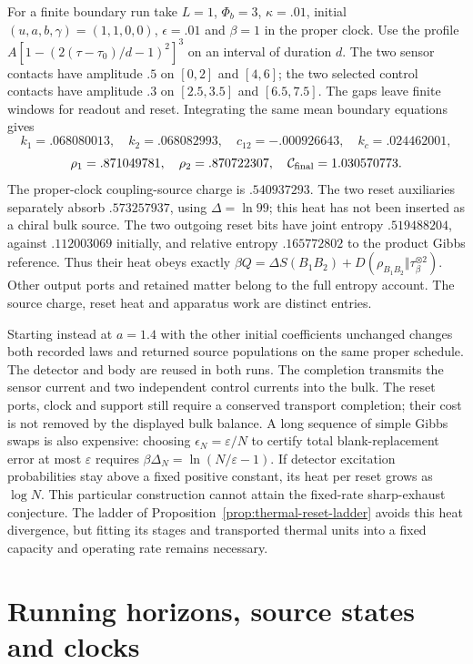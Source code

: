 For a finite boundary run take $L=1$, $\Phi_b=3$, $\kappa=.01$,
initial $(u,a,b,\gamma)=(1,1,0,0)$, $\epsilon=.01$ and $\beta=1$ in
the proper clock. Use the profile
$A[1-(2(\tau-\tau_0)/d-1)^2]^3$ on an interval of duration $d$.
The two sensor contacts have amplitude $.5$ on $[0,2]$ and $[4,6]$;
the two selected control contacts have amplitude $.3$ on $[2.5,3.5]$
and $[6.5,7.5]$. The gaps leave finite windows for readout and reset.
Integrating the same mean boundary equations gives
\[
 k_1=.068080013,\quad k_2=.068082993,\quad
 c_{12}=-.000926643,\quad k_c=.024462001,
\]
\[
 \rho_1=.871049781,\quad \rho_2=.870722307,\quad
 \mathcal C_{\rm final}=1.030570773 .
\]
The proper-clock coupling-source charge is $.540937293$.
The two reset auxiliaries separately absorb $.573257937$, using
$\Delta=\ln99$; this heat has not been inserted as a chiral bulk source.
The two outgoing reset bits have joint entropy $.519488204$, against
$.112003069$ initially, and relative entropy $.165772802$ to the product
Gibbs reference. Thus their heat obeys exactly
$\beta Q=\Delta S(B_1B_2)+D(\rho_{B_1B_2}\Vert\tau_\beta^{\otimes2})$.
Other output ports and retained matter belong to the full entropy account.
The source charge, reset heat and apparatus work are distinct entries.

Starting instead at $a=1.4$ with the other initial coefficients unchanged
changes both recorded laws and returned source populations on the same
proper schedule. The detector and body are reused in both runs.
The completion transmits the sensor current and two independent control
currents into the bulk. The reset ports, clock and support still require a
conserved transport completion; their cost is not removed by the displayed
bulk balance. A long sequence of simple Gibbs swaps is also expensive:
choosing $\epsilon_N=\varepsilon/N$ to certify total blank-replacement error
at most $\varepsilon$ requires
$\beta\Delta_N=\ln(N/\varepsilon-1)$.
If detector excitation probabilities stay above a fixed positive constant,
its heat per reset grows as $\log N$. This particular construction cannot
attain the fixed-rate sharp-exhaust conjecture.
The ladder of Proposition~\ref{prop:thermal-reset-ladder} avoids this heat
divergence, but fitting its stages and transported thermal units into a
fixed capacity and operating rate remains necessary.


\section{Running horizons, source states and clocks}
\label{app:running-clocks}

